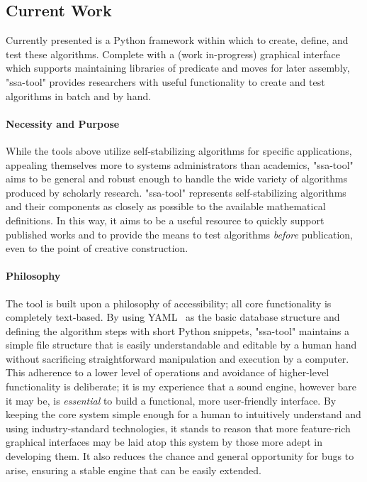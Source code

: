 \subsection{Current Work}
\label{sec:introduction:current-work}
Currently presented is a Python framework within which to
  create, define, and test these algorithms.
Complete with a (work in-progress) graphical interface which supports
  maintaining libraries of predicate and moves for later assembly,
  "ssa-tool" provides researchers with useful functionality
  to create and test algorithms in batch and by hand.


\vspace*{-1.5ex}                  %
\paragraph{Necessity and Purpose}
While the tools above utilize self-stabilizing algorithms for specific applications,
  appealing themselves more to systems administrators than academics,
  "ssa-tool" aims to be general and robust enough to handle
  the wide variety of algorithms produced by scholarly research.
"ssa-tool" represents self-stabilizing algorithms and their components
  as closely as possible to the available mathematical definitions.
In this way, it aims to be a useful resource to quickly support published works
  and to provide the means to test algorithms \emph{before} publication,
  even to the point of creative construction.

\vspace*{-1.5ex}                  %
\paragraph{Philosophy}
The tool is built upon a philosophy of accessibility;
  all core functionality is completely text-based.
By using YAML~\autocite{yaml:ref} as the basic database structure
  and defining the algorithm steps with short Python snippets,
  "ssa-tool" maintains a simple file structure that is easily
  understandable and editable by a human hand
  without sacrificing straightforward
  manipulation and execution by a computer.
This adherence to a lower level of operations and
  avoidance of higher-level functionality is deliberate;
  it is my experience that a sound engine, however bare it may be,
  is \emph{essential} to build a functional, more user-friendly interface.
By keeping the core system simple enough
  for a human to intuitively understand
  and using industry-standard technologies,
  it stands to reason that more feature-rich graphical interfaces
  may be laid atop this system
  by those more adept in developing them.
It also reduces the chance and general opportunity for bugs to arise,
  ensuring a stable engine that can be easily extended.



